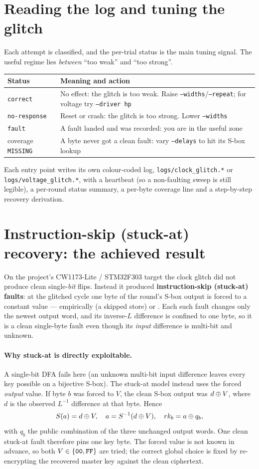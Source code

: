 \section{Reading the log and tuning the glitch}
Each attempt is classified, and the per-trial status is the main tuning signal. The
useful regime lies \emph{between} ``too weak'' and ``too strong''.
\begin{center}\begin{tabular}{P{.28\linewidth}P{.61\linewidth}}\toprule
Status & Meaning and action\\\midrule
\texttt{correct} & No effect: the glitch is too weak. Raise \texttt{--widths}/\texttt{--repeat}; for voltage try \texttt{--driver hp}\\
\texttt{no-response} & Reset or crash: the glitch is too strong. Lower \texttt{--widths}\\
\texttt{fault} & A fault landed and was recorded: you are in the useful zone\\
coverage \texttt{MISSING} & A byte never got a clean fault: vary \texttt{--delays} to hit its S-box lookup\\\bottomrule
\end{tabular}\end{center}
Each entry point writes its own colour-coded log, \texttt{logs/clock\_glitch.*} or
\texttt{logs/voltage\_glitch.*}, with a heartbeat (so a non-faulting sweep is still
legible), a per-round status summary, a per-byte coverage line and a step-by-step
recovery derivation.

\section{Instruction-skip (stuck-at) recovery: the achieved result}
\label{sec:stuck_at_result}
On the project's CW1173-Lite / STM32F303 target the clock glitch did not produce
clean single-\emph{bit} flips. Instead it produced \textbf{instruction-skip
(stuck-at) faults}: at the glitched cycle one byte of the round's S-box output is
forced to a constant value --- empirically  (a skipped store) or
. Each such fault changes only the newest output word, and its
inverse-$L$ difference is confined to one byte, so it is a clean single-byte
fault even though its \emph{input} difference is multi-bit and unknown.

\paragraph{Why stuck-at is directly exploitable.}
A single-bit DFA fails here (an unknown multi-bit input difference leaves every
key possible on a bijective S-box). The stuck-at model instead uses the forced
\emph{output} value. If byte $b$ was forced to $V$, the clean S-box output was
$d\mathbin{\oplus} V$, where $d$ is the observed $L^{-1}$ difference at that byte. Hence
\[
S(a)=d\mathbin{\oplus} V,\quad a=S^{-1}(d\mathbin{\oplus} V),\quad rk_b=a\mathbin{\oplus} q_b,
\]
with $q_b$ the public combination of the three unchanged output words. One clean
stuck-at fault therefore pins one key byte. The forced value is not known in
advance, so both $V\in\{\texttt{00},\texttt{FF}\}$ are tried; the correct global choice
is fixed by re-encrypting the recovered master key against the clean ciphertext.

